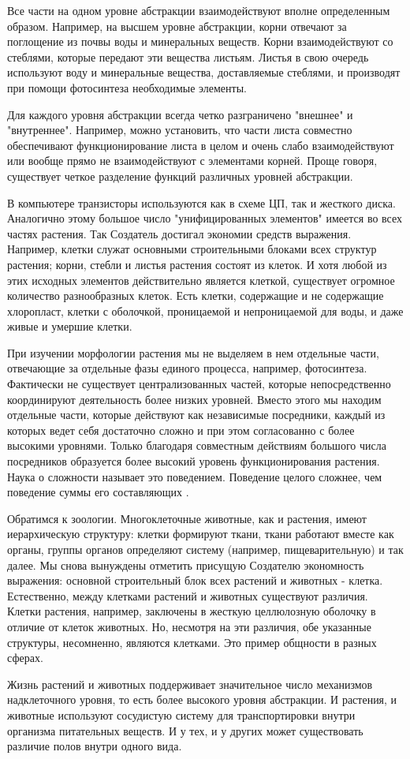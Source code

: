 \documentclass[11pt]{article}
\begin{document}
\par
Все части на одном уровне абстракции взаимодействуют вполне определенным образом. Например, на высшем уровне абстракции, корни отвечают за поглощение из почвы воды и минеральных веществ. Корни взаимодействуют со стеблями, которые передают эти вещества листьям. Листья в свою очередь используют воду и минеральные вещества, доставляемые стеблями, и производят при помощи фотосинтеза необходимые элементы. 
\par
Для каждого уровня абстракции всегда четко разграничено "внешнее" и "внутреннее". Например, можно установить, что части листа совместно обеспечивают функционирование листа в целом и очень слабо взаимодействуют или вообще прямо не взаимодействуют с элементами корней. Проще говоря, существует четкое разделение функций различных уровней абстракции. 
\par
В компьютере транзисторы используются как в схеме ЦП, так и жесткого диска. Аналогично этому большое число "унифицированных элементов" имеется во всех частях растения. Так Создатель достигал экономии средств выражения. Например, клетки служат основными строительными блоками всех структур растения; корни, стебли и листья растения состоят из клеток. И хотя любой из этих исходных элементов действительно является клеткой, существует огромное количество разнообразных клеток. Есть клетки, содержащие и не содержащие хлоропласт, клетки с оболочкой, проницаемой и непроницаемой для воды, и даже живые и умершие клетки. 
\par
При изучении морфологии растения мы не выделяем в нем отдельные части, отвечающие за отдельные фазы единого процесса, например, фотосинтеза. Фактически не существует централизованных частей, которые непосредственно координируют деятельность более низких уровней. Вместо этого мы находим отдельные части, которые действуют как независимые посредники, каждый из которых ведет себя достаточно сложно и при этом согласованно с более высокими уровнями. Только благодаря совместным действиям большого числа посредников образуется более высокий уровень функционирования растения. Наука о сложности называет это { поведением}. Поведение целого сложнее, чем поведение суммы его составляющих . 
\par
Обратимся к зоологии. Многоклеточные животные, как и растения, имеют иерархическую структуру: клетки формируют ткани, ткани работают вместе как органы, группы органов определяют систему (например, пищеварительную) и так далее. Мы снова вынуждены отметить присущую Создателю экономность выражения: основной строительный блок всех растений и животных - клетка. Естественно, между клетками растений и животных существуют различия. Клетки растения, например, заключены в жесткую целлюлозную оболочку в отличие от клеток животных. Но, несмотря на эти различия, обе указанные структуры, несомненно, являются клетками. Это пример общности в разных сферах. 
\par
Жизнь растений и животных поддерживает значительное число механизмов надклеточного уровня, то есть более высокого уровня абстракции. И растения, и животные используют сосудистую систему для транспортировки внутри организма питательных веществ. И у тех, и у других может существовать различие полов внутри одного вида. 
\parskip=0pt
\end{document}
